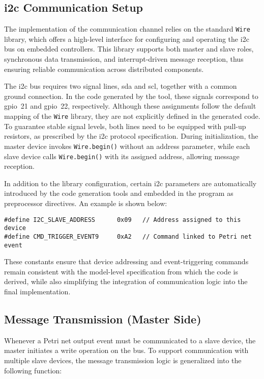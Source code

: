 \subsection{\gls{i2c} Communication Setup}
The implementation of the communication channel relies on the standard \texttt{Wire} library, which offers a high-level interface for configuring and operating the \gls{i2c} bus on embedded controllers. This library supports both master and slave roles, synchronous data transmission, and interrupt-driven message reception, thus ensuring reliable communication across distributed components.

The \gls{i2c} bus requires two signal lines, \gls{sda} and \gls{scl}, together with a common ground connection. In the code generated by the tool, these signals correspond to \gls{gpio}~21 and \gls{gpio}~22, respectively. Although these assignments follow the default mapping of the \texttt{Wire} library, they are not explicitly defined in the generated code. To guarantee stable signal levels, both lines need to be equipped with pull-up resistors, as prescribed by the \gls{i2c} protocol specification. During initialization, the master device invokes \texttt{Wire.begin()} without an address parameter, while each slave device calls \texttt{Wire.begin()} with its assigned address, allowing message reception.

In addition to the library configuration, certain \gls{i2c} parameters are automatically introduced by the code generation tools and embedded in the program as preprocessor directives. An example is shown below:
\begin{verbatim}
#define I2C_SLAVE_ADDRESS      0x09   // Address assigned to this device
#define CMD_TRIGGER_EVENT9     0xA2   // Command linked to Petri net event
\end{verbatim}
These constants ensure that device addressing and event-triggering commands remain consistent with the model-level specification from which the code is derived, while also simplifying the integration of communication logic into the final implementation.

\subsection{Message Transmission (Master Side)}
Whenever a Petri net output event must be communicated to a slave device, the master initiates a write operation on the bus. To support communication with multiple slave devices, the message transmission logic is generalized into the following function:


